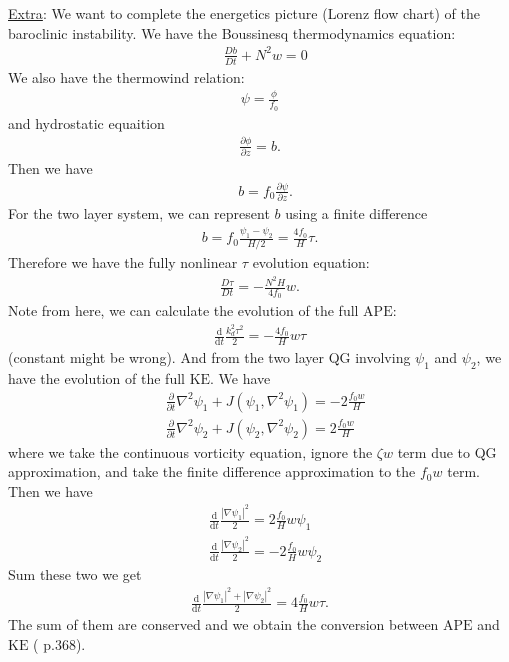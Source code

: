 \documentclass[11pt,letterpaper]{book}
\theoremstyle{definition}
\newcommand{\de}{\mathrm{d}}
\newcommand{\pe}{\partial}
\newcommand{\APE}{\text{APE}}
\newcommand{\KE}{\text{KE}}
\begin{document}
\underline{Extra}: We want to complete the energetics picture (Lorenz flow chart) of the baroclinic instability. We have the Boussinesq thermodynamics equation:
\begin{align*}
&\frac{Db}{Dt} + N^2w = 0
\end{align*}
We also have the thermowind relation:
\begin{align*}
\psi = \frac{\phi}{f_0}
\end{align*}
and hydrostatic equaition
\begin{align*}
\frac{\pe\phi}{\pe z} = b.
\end{align*}
Then we have
\begin{align*}
&b = f_0\frac{\pe\psi}{\pe z}.
\end{align*} 
For the two layer system, we can represent $b$ using a finite difference
\begin{align*}
b = f_0\frac{\psi_1-\psi_2}{H/2} = \frac{4f_0}{H}\tau.
\end{align*}
Therefore we have the fully nonlinear $\tau$ evolution equation:
\begin{align}
\frac{D\tau}{Dt} = -\frac{N^2H}{4f_0} w.\label{eq:sep_2010_3}
\end{align}
Note from here, we can calculate the evolution of the full $\APE$: 
\begin{align*}
    \frac{\de}{\de t}\frac{k_d^2\tau^2}{2} = -\frac{4f_0}{H} w\tau
\end{align*}
(constant might be wrong). And from the two layer QG involving $\psi_1$ and $\psi_2$, we have the evolution of the full $\KE$. We have
\begin{align*}
    &\frac{\pe}{\pe t}\nabla^2\psi_1+J(\psi_1,\nabla^2\psi_1) = -2\frac{f_0 w}{H}\\
    &\frac{\pe}{\pe t}\nabla^2\psi_2+J(\psi_2,\nabla^2\psi_2) = 2\frac{f_0 w}{H}
\end{align*}
where we take the continuous vorticity equation, ignore the $\zeta w$ term due to QG approximation, and take the finite difference approximation to the $f_0w$ term. Then we have
\begin{align*}
    &\frac{\de}{\de t}\frac{|\nabla\psi_1|^2}{2} = 2\frac{f_0 }{H}w \psi_1\\
    &\frac{\de}{\de t}\frac{|\nabla\psi_2|^2}{2} = -2\frac{f_0 }{H}w \psi_2
\end{align*}
Sum these two we get
\begin{align*}
    \frac{\de}{\de t}\frac{|\nabla\psi_1|^2+|\nabla\psi_2|^2}{2} = 4\frac{f_0 }{H}w\tau.
\end{align*}
The sum of them are conserved and we obtain the conversion between $\APE$ and $\KE$  (\cite{vallis} p.368). 
\end{document}
